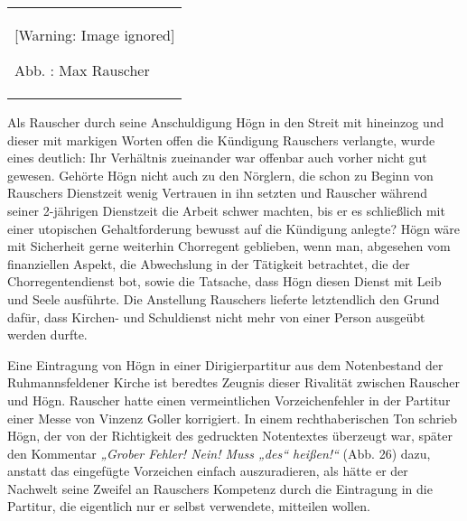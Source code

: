 \documentclass[a4paper]{article}
\newcommand\textstyleZitate[1]{\textit{#1}}
\newcounter{Abb}
\renewcommand\theAbb{\arabic{Abb}}
\begin{document}
\begin{center}
\begin{minipage}{4.591cm}
\begin{center}
\tablefirsthead{}
\tablehead{}
\tabletail{}
\tablelasttail{}
\begin{supertabular}{m{4.3910003cm}}
  [Warning: Image ignored] %
 
Abb. \stepcounter{Abb}{\theAbb}: Max Rauscher\\
\end{supertabular}
\end{center}
\end{minipage}
\end{center}
Als Rauscher durch seine Anschuldigung Högn in den Streit mit hineinzog
und dieser mit markigen Worten offen die Kündigung Rauschers verlangte,
wurde eines deutlich: Ihr Verhältnis zueinander war offenbar auch
vorher nicht gut gewesen. Gehörte Högn nicht auch zu den Nörglern, die
schon zu Beginn von Rauschers Dienstzeit wenig Vertrauen in ihn setzten
und Rauscher während seiner 2-jährigen Dienstzeit die Arbeit schwer
machten, bis er es schließlich mit einer utopischen Gehaltforderung
bewusst auf die Kündigung anlegte? Högn wäre mit Sicherheit gerne
weiterhin Chorregent geblieben, wenn man, abgesehen vom finanziellen
Aspekt, die Abwechslung in der Tätigkeit betrachtet, die der
Chorregentendienst bot, sowie die Tatsache, dass Högn diesen Dienst mit
Leib und Seele ausführte. Die Anstellung Rauschers lieferte
letztendlich den Grund dafür, dass Kirchen- und Schuldienst nicht mehr
von einer Person ausgeübt werden durfte.

Eine Eintragung von Högn in einer Dirigierpartitur aus dem Notenbestand
der Ruhmannsfeldener Kirche ist beredtes Zeugnis dieser Rivalität
zwischen Rauscher und Högn. Rauscher hatte einen vermeintlichen
Vorzeichenfehler in der Partitur einer Messe von Vinzenz Goller
korrigiert. In einem rechthaberischen Ton schrieb Högn, der von der
Richtigkeit des gedruckten Notentextes überzeugt war, später den
Kommentar \textstyleZitate{„Grober Fehler! Nein! Muss „des“ heißen!“
}(Abb. 26) dazu, anstatt das eingefügte Vorzeichen einfach
auszuradieren, als hätte er der Nachwelt seine Zweifel an Rauschers
Kompetenz durch die Eintragung in die Partitur, die eigentlich nur er
selbst verwendete, mitteilen wollen.
\end{document}
